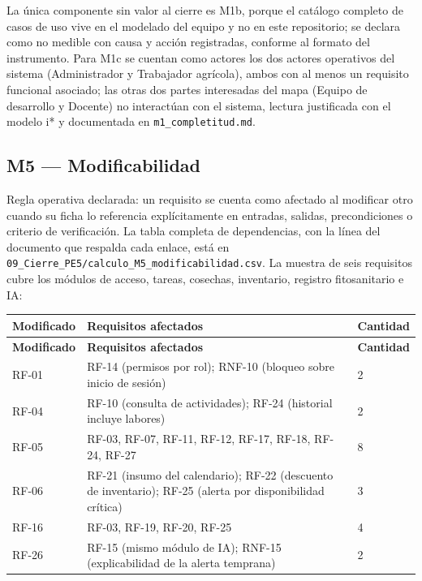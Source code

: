 \noindent La única componente sin valor al cierre es M1b, porque el catálogo completo de casos de uso vive en el modelado del equipo y no en este repositorio; se declara como no medible con causa y acción registradas, conforme al formato del instrumento. Para M1c se cuentan como actores los dos actores operativos del sistema (Administrador y Trabajador agrícola), ambos con al menos un requisito funcional asociado; las otras dos partes interesadas del mapa (Equipo de desarrollo y Docente) no interactúan con el sistema, lectura justificada con el modelo i* y documentada en \texttt{m1\_completitud.md}.



\subsection{M5 --- Modificabilidad}
\label{sec:m5-modificabilidad}

Regla operativa declarada: un requisito se cuenta como afectado al modificar otro cuando su ficha lo referencia explícitamente en entradas, salidas, precondiciones o criterio de verificación. La tabla completa de dependencias, con la línea del documento que respalda cada enlace, está en \texttt{09\_Cierre\_PE5/calculo\_M5\_modificabilidad.csv}. La muestra de seis requisitos cubre los módulos de acceso, tareas, cosechas, inventario, registro fitosanitario e IA:

\begin{center}
\begin{longtable}{|p{2.0cm}|p{9.0cm}|p{1.7cm}|}
\hline
\textbf{Modificado} & \textbf{Requisitos afectados} & \textbf{Cantidad} \\
\hline
\endfirsthead
\hline
\textbf{Modificado} & \textbf{Requisitos afectados} & \textbf{Cantidad} \\
\hline
\endhead
\hline
\endfoot
\hline
\endlastfoot
RF-01 & RF-14 (permisos por rol); RNF-10 (bloqueo sobre inicio de sesión) & 2 \\
\hline
RF-04 & RF-10 (consulta de actividades); RF-24 (historial incluye labores) & 2 \\
\hline
RF-05 & RF-03, RF-07, RF-11, RF-12, RF-17, RF-18, RF-24, RF-27 & 8 \\
\hline
RF-06 & RF-21 (insumo del calendario); RF-22 (descuento de inventario); RF-25 (alerta por disponibilidad crítica) & 3 \\
\hline
RF-16 & RF-03, RF-19, RF-20, RF-25 & 4 \\
\hline
RF-26 & RF-15 (mismo módulo de IA); RNF-15 (explicabilidad de la alerta temprana) & 2 \\
\hline
\end{longtable}
\label{tab:m5-muestra}
\end{center}

